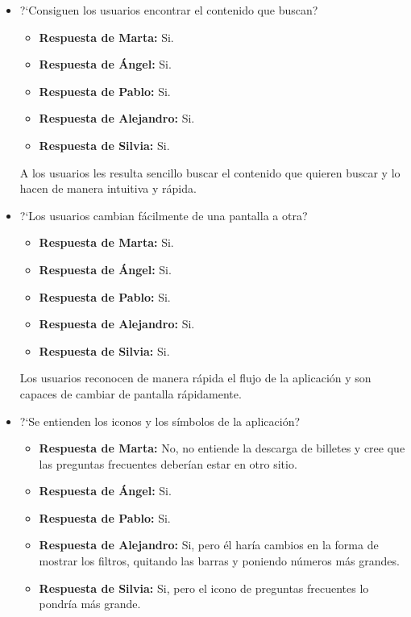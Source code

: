 \begin{itemize}
    \item ?`Consiguen los usuarios encontrar el contenido que buscan?
          \begin{itemize}
              \item\textbf{Respuesta de Marta:} Si.
              \item \textbf{Respuesta de Ángel:} Si.
              \item\textbf{Respuesta de Pablo:} Si.
              \item\textbf{Respuesta de Alejandro:} Si.
              \item\textbf{Respuesta de Silvia:} Si.
          \end{itemize}
          A los usuarios les resulta sencillo buscar el contenido que quieren buscar y lo hacen de manera intuitiva y rápida.
    \item ?`Los usuarios cambian fácilmente de una pantalla a otra?
          \begin{itemize}
              \item\textbf{Respuesta de Marta:} Si.
              \item \textbf{Respuesta de Ángel:} Si.
              \item\textbf{Respuesta de Pablo:} Si.
              \item\textbf{Respuesta de Alejandro:} Si.
              \item\textbf{Respuesta de Silvia:} Si.
          \end{itemize}
          Los usuarios reconocen de manera rápida el flujo de la aplicación y son capaces de cambiar de pantalla rápidamente.
    \item ?`Se entienden los iconos y los símbolos de la aplicación?
          \begin{itemize}
              \item\textbf{Respuesta de Marta:} No, no entiende la descarga de billetes y cree que las preguntas frecuentes deberían estar en otro sitio.
              \item \textbf{Respuesta de Ángel:} Si.
              \item\textbf{Respuesta de Pablo:} Si.
              \item\textbf{Respuesta de Alejandro:} Si, pero él haría cambios en la forma de mostrar los filtros, quitando las barras y poniendo números más grandes.
              \item\textbf{Respuesta de Silvia:} Si, pero el icono de preguntas frecuentes lo pondría más grande.
          \end{itemize}

\end{itemize}
